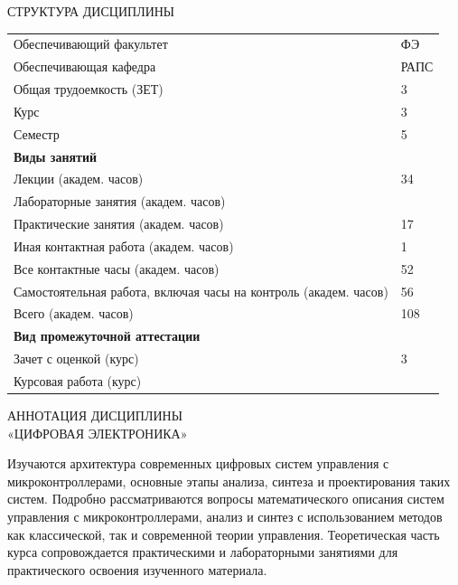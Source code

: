 


\newpage

\begin{section}{СТРУКТУРА ДИСЦИПЛИНЫ}

\begin{tabular}{ll}
Обеспечивающий факультет & ФЭ \\
Обеспечивающая кафедра   & РАПС\\
Общая трудоемкость (ЗЕТ) & 3 \\
Курс                     & 3 \\
Семестр                  & 5 \\
\bf{Виды занятий} \\
Лекции (академ. часов)   & 34 \\
Лабораторные занятия (академ. часов) \\
Практические занятия (академ. часов) & 17 \\
Иная контактная работа (академ. часов) & 1\\
Все контактные часы (академ. часов) & 52 \\
Самостоятельная работа, включая часы на контроль
(академ. часов) & 56 \\
Всего (академ. часов) & 108\\
\bf{Вид промежуточной аттестации}\\

Зачет с оценкой (курс) & 3 \\
Курсовая работа (курс) \\
 
\end{tabular}

\end{section}

\newpage

\begin{section}{АННОТАЦИЯ ДИСЦИПЛИНЫ \\ «ЦИФРОВАЯ ЭЛЕКТРОНИКА»}

Изучаются архитектура современных цифровых систем управления с микроконтроллерами, основные этапы анализа, синтеза и проектирования таких систем. Подробно рассматриваются вопросы математического описания систем управления с микроконтроллерами, анализ и синтез с использованием методов как классической, так и современной теории управления. Теоретическая часть курса сопровождается практическими и лабораторными занятиями для практического освоения изученного материала.

\end{section}

